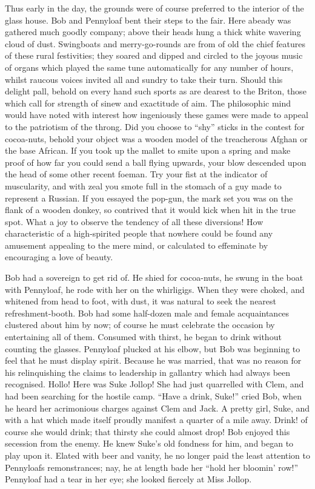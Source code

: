 Thus early in the day, the grounds were of course preferred to the
interior of the glass house. Bob and Pennyloaf bent their steps to the
fair. Here abeady was gathered much goodly company; above their heads
hung a thick white wavering cloud of dust. Swingboats and
merry-go-rounds are from of old the chief features of these rural
festivities; they soared and dipped and circled to the joyous music of
organs which played the {\protect\hypertarget{259}{}{}}same tune
automatically for any number of hours, whilst raucous voices invited all
and sundry to take their turn. Should this delight pall, behold on every
hand such sports as are dearest to the Briton, those which call for
strength of sinew and exactitude of aim. The philosophic mind would have
noted with interest how ingeniously these games were made to appeal to
the patriotism of the throng. Did you choose to ``shy'' sticks in the
contest for cocoa-nuts, behold your object was a wooden model of the
treacherous Afghan or the base African. If you took up the mallet to
smite upon a spring and make proof of how far you could send a ball
flying upwards, your blow descended upon the head of some other recent
foeman. Try your fist at the indicator of muscularity, and with zeal you
smote full in the stomach of a guy made to represent a Russian. If you
essayed the pop-gun, the mark set you was on the flank of a wooden
donkey, so contrived that it would kick when hit in the true spot. What
a joy to observe the {\protect\hypertarget{260}{}{}}tendency of all
these diversions! How characteristic of a high-spirited people that
nowhere could be found any amusement appealing to the mere mind, or
calculated to effeminate by encouraging a love of beauty.

Bob had a sovereign to get rid of. He shied for cocoa-nuts, he swung in
the boat with Pennyloaf, he rode with her on the whirligigs. When they
were choked, and whitened from head to foot, with dust, it was natural
to seek the nearest refreshment-booth. Bob had some half-dozen male and
female acquaintances clustered about him by now; of course he must
celebrate the occasion by entertaining all of them. Consumed with
thirst, he began to drink without counting the glasses. Pennyloaf
plucked at his elbow, but Bob was beginning to feel that he must display
spirit. Because he was married, that was no reason for his relinquishing
the claims to leadership in gallantry which had always been recognised.
Hollo! Here was Suke Jollop! She had just quarrelled with Clem, and had
been searching for the hostile camp.
{\protect\hypertarget{261}{}{}}``Have a drink, Suke!'' cried Bob, when
he heard her acrimonious charges against Clem and Jack. A pretty girl,
Suke, and with a hat which made itself proudly manifest a quarter of a
mile away. Drink! of course she would drink; that thirsty she could
almost drop! Bob enjoyed this secession from the enemy. He knew Suke's
old fondness for him, and began to play upon it. Elated with beer and
vanity, he no longer paid the least attention to Pennyloafs
remonstrances; nay, he at length bade her ``hold her bloomin' row!''
Pennyloaf had a tear in her eye; she looked fiercely at Miss Jollop.

